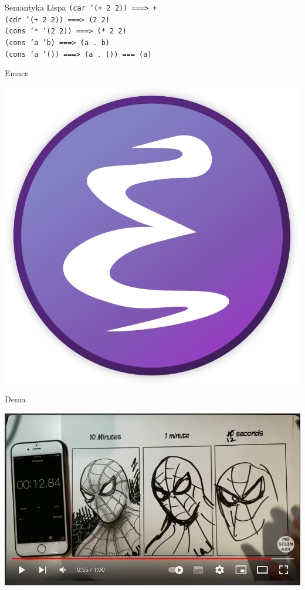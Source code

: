 \documentclass{beamer}
\begin{document}
\begin{frame}{Semantyka Lispa}
  \texttt{(car '(+ 2 2)) ===> +} \\ \pause
  \texttt{(cdr '(+ 2 2)) ===> (2 2)} \\ \pause
  \texttt{(cons '* '(2 2)) ===> (* 2 2)} \\ \pause
  \texttt{(cons 'a 'b) ===> (a .\ b)} \\ \pause
  \texttt{(cons 'a '()) ===> (a .\ ()) === (a)}
\end{frame}

\begin{frame}{Emacs}
  \begin{center}
    \includegraphics[height=0.7\paperheight]{emacs.png}
  \end{center}
\end{frame}

\begin{frame}{Dema}
  \begin{center}
    \includegraphics[height=0.7\paperheight]{drawing-spiderman.jpg}
  \end{center}
\end{frame}
\end{document}
